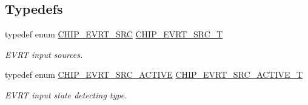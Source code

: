 \subsection*{Typedefs}
\begin{DoxyCompactItemize}
\item 
typedef enum \hyperlink{group___e_v_r_t__18_x_x__43_x_x_gad3cd727405aa5446c2319375ad1b7276}{C\+H\+I\+P\+\_\+\+E\+V\+R\+T\+\_\+\+S\+RC} \hyperlink{group___e_v_r_t__18_x_x__43_x_x_gaa43c01b5839b8ef001017d1d1150b16d}{C\+H\+I\+P\+\_\+\+E\+V\+R\+T\+\_\+\+S\+R\+C\+\_\+T}
\begin{DoxyCompactList}\small\item\em E\+V\+RT input sources. \end{DoxyCompactList}\item 
typedef enum \hyperlink{group___e_v_r_t__18_x_x__43_x_x_ga721fc5bcb9c562312b880ba4cd5b96a6}{C\+H\+I\+P\+\_\+\+E\+V\+R\+T\+\_\+\+S\+R\+C\+\_\+\+A\+C\+T\+I\+VE} \hyperlink{group___e_v_r_t__18_x_x__43_x_x_ga41e06d681302344e72fc1eca77f708b4}{C\+H\+I\+P\+\_\+\+E\+V\+R\+T\+\_\+\+S\+R\+C\+\_\+\+A\+C\+T\+I\+V\+E\+\_\+T}
\begin{DoxyCompactList}\small\item\em E\+V\+RT input state detecting type. \end{DoxyCompactList}\end{DoxyCompactItemize}
